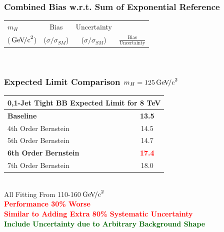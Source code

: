 \documentclass{beamer}
\newcommand{\GeVcc}{\ensuremath{\,\mathrm{Ge\kern -0.1em V\!/c}^2}}
\newcommand{\tredbf}[1]{\textcolor{red}{\bf #1}}
\newcommand{\tgreenbf}[1]{\textcolor{darkgreen}{\bf #1}}
\begin{document}
\begin{frame}
\frametitle{Combined Bias w.r.t. Sum of Exponential Reference}
  \begin{center}
    \scriptsize
    \begin{tabular}{|l|c|c|c|} \hline
$m_H$         & Bias & Uncertainty & \\ 
(\GeVcc{})         & ($\sigma/\sigma_{SM}$) & ($\sigma/\sigma_{SM}$) & $\frac{\mathrm{Bias}}{\mathrm{Uncertainty}}$ \\ \hline \hline
    \end{tabular}
\\
  \small
  \end{center}
\end{frame}

\begin{frame}
\frametitle{Expected Limit Comparison $m_H=125\GeVcc{}$}
\begin{center}
\begin{tabular}{|l|c|} \hline
\multicolumn{2}{|c|}{ \bf 0,1-Jet Tight BB Expected Limit for 8 TeV} \\ \hline
\bf Baseline          &      \bf 13.5   \\ \hline
4th Order Bernstein         & 14.5        \\ \hline
5th Order Bernstein         & 14.7        \\ \hline
\bf 6th Order Bernstein         & \tredbf{17.4}        \\ \hline
7th Order Bernstein         & 18.0        \\ \hline
\end{tabular}
\\
All Fitting From 110-160\GeVcc{}
\\ \vspace{1em}
\large
\tredbf{
Performance 30\% Worse
\\
Similar to Adding Extra 80\% Systematic Uncertainty
}
\\
\tgreenbf{Include Uncertainty due to Arbitrary Background Shape}
\end{center}
\end{frame}
\end{document}
